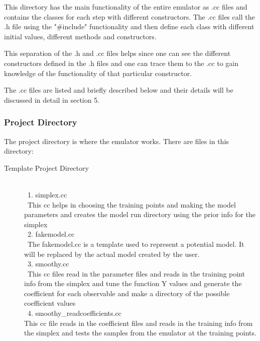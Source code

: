 \documentclass[12pt]{article}
\numberwithin{equation}{section}
\numberwithin{figure}{section}
\begin{document}
This directory has the main functionality of the entire emulator as .cc files and contains the classes for each step with different constructors. The .cc files call the .h file using the "\#include" functionality and then define each class with different initial values, different methods and constructors. 

This separation of the .h and .cc files helps since one can see the different constructors defined in the .h files and one can trace them to the .cc to gain knowledge of the functionality of that particular constructor.

The .cc files are listed and briefly described below and their details will be discussed in detail in section 5. 

\subsubsection{Project Directory}

The project directory is where the emulator works. There are files in this directory: 


\begin{description}
\item[Template Project Directory] \
\\
\ 1. simplex.cc \\
\ This cc helps in choosing the training points and making the model parameters and creates the model run directory using the prior info for the simplex \\

\ 2. fakemodel.cc \\

\ The fakemodel.cc is a template used to represent a potential model. It will be replaced by the actual model created by the user. \\ 

\ 3. smoothy.cc \\

\ This cc files read in the parameter files and reads in the training point info from the simplex and tune the function Y values and generate the coefficient for each observable and make a directory of the possible coefficient values \\

\ 4. smoothy\_readcoefficients.cc \\

This cc file reads in the coefficient files and reads in the training info from the simplex and tests the samples from the emulator at the training points. 


\end{description}
\end{document}
